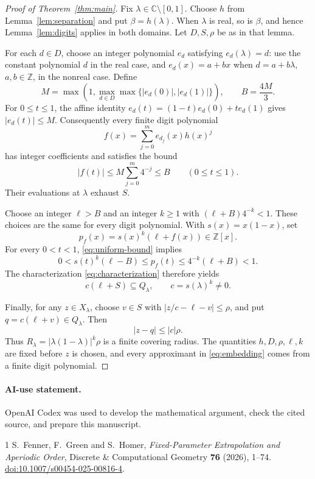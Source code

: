 \documentclass[11pt]{article}
\newcommand{\C}{\mathbb C}
\newcommand{\Z}{\mathbb Z}
\begin{document}
\begin{proof}[Proof of Theorem~\ref{thm:main}]
Fix $\lambda\in\C\setminus[0,1]$. Choose $h$ from
Lemma~\ref{lem:separation} and put $\beta=h(\lambda)$. When $\lambda$ is
real, so is $\beta$, and hence Lemma~\ref{lem:digits} applies in both
domains. Let $D,S,\rho$ be as in that lemma.

For each $d\in D$, choose an integer polynomial $e_d$ satisfying
$e_d(\lambda)=d$: use the constant polynomial $d$ in the real case,
and $e_d(x)=a+bx$ when $d=a+b\lambda$, $a,b\in\Z$, in the nonreal case.
Define
\[
 M=\max\!\left(1,\max_{d\in D}\max\{|e_d(0)|,|e_d(1)|\}\right),
 \qquad B=\frac{4M}{3}.
\]
For $0\le t\le1$, the affine identity
$e_d(t)=(1-t)e_d(0)+te_d(1)$ gives $|e_d(t)|\le M$. Consequently every
finite digit polynomial
\[
 f(x)=\sum_{j=0}^m e_{d_j}(x)h(x)^j
\]
has integer coefficients and satisfies the bound
\begin{equation}\label{eq:uniform-bound}
 |f(t)|\le M\sum_{j=0}^m4^{-j}\le B
 \qquad(0\le t\le1).
\end{equation}
Their evaluations at $\lambda$ exhaust $S$.

Choose an integer $\ell>B$ and an integer $k\ge1$ with
$(\ell+B)4^{-k}<1$. These choices are the same for every digit polynomial.
With $s(x)=x(1-x)$, set
\[
 p_f(x)=s(x)^k(\ell+f(x))\in\Z[x].
\]
For every $0<t<1$, \eqref{eq:uniform-bound} implies
\[
 0<s(t)^k(\ell-B)\le p_f(t)\le4^{-k}(\ell+B)<1.
\]
The characterization \eqref{eq:characterization} therefore yields
\begin{equation}\label{eq:embedding}
 c(\ell+S)\subseteq Q_\lambda,
 \qquad c=s(\lambda)^k\ne0.
\end{equation}

Finally, for any $z\in X_\lambda$, choose $v\in S$ with
$|z/c-\ell-v|\le\rho$, and put $q=c(\ell+v)\in Q_\lambda$. Then
\[
 |z-q|\le |c|\rho.
\]
Thus $R_\lambda=|\lambda(1-\lambda)|^k\rho$ is a finite covering radius.
The quantities $h,D,\rho,\ell,k$ are fixed before $z$ is chosen, and every
approximant in \eqref{eq:embedding} comes from a finite digit polynomial.
\end{proof}

\paragraph{AI-use statement.}
OpenAI Codex was used to develop the mathematical argument, check the cited
source, and prepare this manuscript.

\begin{thebibliography}{1}
S.~Fenner, F.~Green and S.~Homer,
\emph{Fixed-Parameter Extrapolation and Aperiodic Order},
Discrete \& Computational Geometry \textbf{76} (2026), 1--74.
\href{https://doi.org/10.1007/s00454-025-00816-4}{doi:10.1007/s00454-025-00816-4}.
\end{thebibliography}
\end{document}
